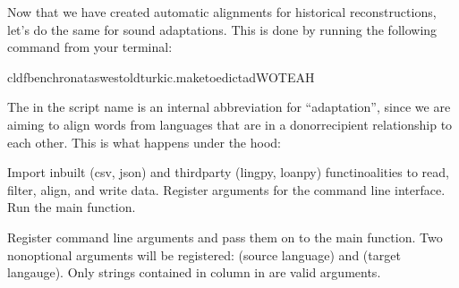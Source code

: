 \documentclass[letterpaper,10pt,english]{sphinxmanual}
\begin{document}
\sphinxAtStartPar
Now that we have created automatic alignments for historical reconstructions,
let’s do the same for sound adaptations. This is done by running the following
command from your terminal:

\begin{sphinxVerbatim}[commandchars=\\\{\}]
cldfbenchronataswestoldturkic.maketoedict\PYGZus{}adWOTEAH
\end{sphinxVerbatim}

\sphinxAtStartPar
The  in the script name is an internal abbreviation for “adaptation”,
since we are aiming
to align words from languages that are in a donor\sphinxhyphen{}recipient relationship to
each other. This is what happens under the hood:

\label{\detokenize{mkedictor:module-ronataswestoldturkiccommands.maketoedict_ad}}
\sphinxAtStartPar
Import inbuilt (csv, json) and third\sphinxhyphen{}party (lingpy, loanpy) functinoalities to
read, filter, align, and write data.
Register arguments for the command line interface. Run the main function.

\begin{fulllineitems}
\label{\detokenize{mkedictor:ronataswestoldturkiccommands.maketoedict_ad.register}}
\pysigstartsignatures
{}
\pysigstopsignatures
\sphinxAtStartPar
Register command line arguments and pass them on to the main function.
Two non\sphinxhyphen{}optional arguments will be registered:
 (source language) and  (target langauge).
Only strings contained in column  in  are valid
arguments.

\end{fulllineitems}

\end{document}
